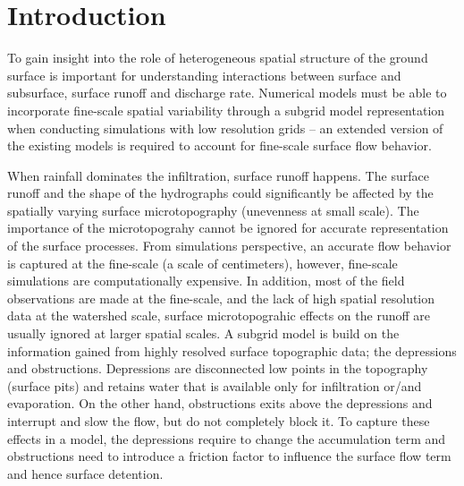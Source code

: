 \documentclass[review,11pt]{elsarticle}
\begin{document}
\linenumbers

\section{Introduction}\label{introduction}
 
To gain insight into the role of heterogeneous spatial structure of the ground surface is important for understanding interactions between surface and subsurface, surface runoff and discharge rate. Numerical models must be able to incorporate fine-scale spatial variability through a subgrid model representation when conducting simulations with low resolution grids -- an extended version of the existing models is required to account for fine-scale surface flow behavior. 

When rainfall dominates the infiltration, surface runoff happens. The surface runoff and the shape of the hydrographs could significantly be affected by the spatially varying surface microtopography (unevenness at small scale). The importance of the microtopograhy  cannot be ignored for accurate representation of the surface processes. From simulations perspective, an accurate flow behavior is captured at the fine-scale (a scale of centimeters), however, fine-scale simulations are computationally expensive. In addition, most of the field observations are made at the fine-scale, and the lack of high spatial resolution data at the watershed scale, surface microtopograhic effects on the runoff are usually ignored at larger spatial scales. A subgrid model is build on the information gained from highly resolved surface topographic data; the depressions and obstructions. Depressions are disconnected low points in the topography (surface pits) and retains water that is available only for infiltration or/and evaporation. On the other hand, obstructions exits above the depressions and interrupt and slow the flow, but do not completely block it. To capture these effects in a model, the depressions require to change the accumulation term and obstructions need to introduce a friction factor to influence the surface flow term and hence surface detention.
\end{document}
